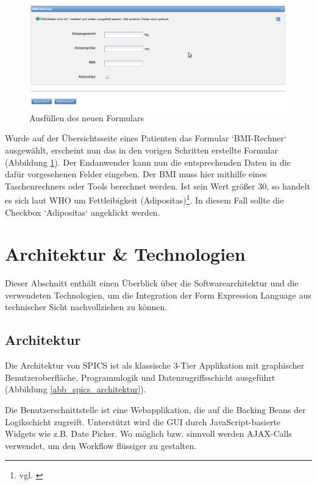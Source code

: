 \begin{figure}[h]
\begin{center}
\includegraphics[scale=0.5]{figures/workflow_formular_ausfuellen}
\caption{Ausfüllen des neuen Formulars}

\label{abb_workflow_formular_ausfuellen}
\end{center}
\end{figure}

Wurde auf der Übersichtsseite eines Patienten das Formular `BMI-Rechner` ausgewählt, erscheint nun das in den vorigen Schritten erstellte Formular (Abbildung \ref{abb_workflow_formular_ausfuellen}). Der Endanwender kann nun die entsprechenden Daten in die dafür vorgesehenen Felder eingeben. Der BMI muss hier mithilfe eines Taschenrechners oder Tools berechnet werden. Ist sein Wert größer 30, so handelt es sich laut WHO um Fettleibigkeit (Adipositas)\footnote{ vgl. \cite{Who00} }. In diesem Fall sollte die Checkbox `Adipositas` angeklickt werden.



\section{Architektur \& Technologien}

Dieser Abschnitt enthält einen Überblick über die Softwarearchitektur und die verwendeten Technologien, um die Integration der Form Expression Language aus technischer Sicht nachvollziehen zu können.


\subsection{Architektur}

Die Architektur von SPICS ist als klassische 3-Tier Applikation mit graphischer Benutzeroberfläche, Programmlogik und Datenzugriffsschicht ausgeführt (Abbildung \ref{abb_spics_architektur}). 

Die Benutzerschnittstelle ist eine Webapplikation, die auf die Backing Beans der Logikschicht zugreift. Unterstützt wird die GUI durch Java\-Script-basierte Widgets wie z.B. Date Picker. Wo möglich bzw. sinnvoll werden AJAX-Calls verwendet, um den Workflow flüssiger zu gestalten.

